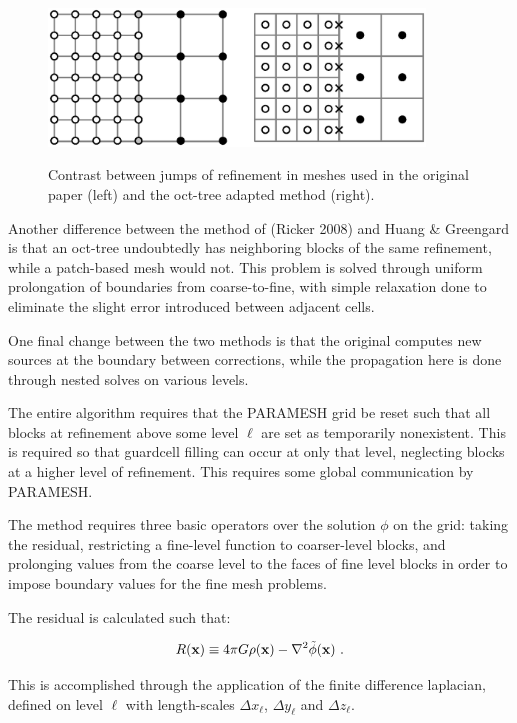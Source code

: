 \begin{figure}[!ht]
\begin{center}
{\leavevmode\includegraphics[width=100mm]{GridSolvers_hgMultigrid_f1}}
\end{center}
\caption{\label{Fig:GridSolvers_hgMultigrid_f1} Contrast between jumps of refinement in meshes used in the original paper
(left) and the oct-tree adapted method (right).}
\end{figure}

Another difference between the method of (Ricker 2008) and Huang \& Greengard is
that an oct-tree undoubtedly has neighboring blocks of the same
refinement, while a patch-based mesh would not. This problem is solved through
uniform prolongation of boundaries from coarse-to-fine, with simple relaxation
done to eliminate the slight error introduced between adjacent cells.

One final change between the two methods is that the original computes new
sources at the boundary between corrections, while the propagation here is done
through nested solves on various levels. 

The entire algorithm requires that the PARAMESH grid be reset such that all
blocks at refinement above some level $\ell$ are set as temporarily nonexistent.
This is required so that guardcell filling can occur at only that level,
neglecting blocks at a higher level of refinement.  This requires some global
communication by PARAMESH.

The method requires three basic operators over the solution $\phi$ on the grid:
taking the residual, restricting a fine-level function to coarser-level blocks,
and prolonging values from the coarse level to the faces of fine level blocks in
order to impose boundary values for the fine mesh problems.

The residual is calculated such that: 

\begin{equation}
\label{Eqn:residual}
R({\bf x}) \equiv  4\pi G \rho({\bf x}) - \nabla^2 \tilde\phi({\bf x})\ .
\end{equation}

This is accomplished through the application of the finite difference laplacian,
defined on level $\ell$ with length-scales $\Delta x_\ell$, $\Delta y_\ell$ and
$\Delta z_\ell$.

